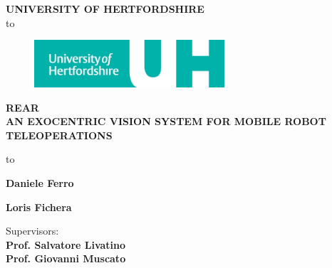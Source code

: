 \begin{titlepage}
  \begin{center}
    \textbf{\uppercase{University of HertfordShire}}\\
    \hbox to \textwidth{\hrulefill}
    
    \vspace{1truecm}
    
    \begin{figure}[!h]
      \begin{center}
        \includegraphics[width=200pt]{img/uni_logo}  %
      \end{center}
    \end{figure}
              
    \uppercase{ \textbf{
        REAR \\ an exocentric vision system for mobile robot teleoperations 
      }}
              
    \vspace{1truecm}
    
    \hbox to \textwidth{\hrulefill}
    
    \vspace{1truecm}
    
    \begin{flushright}
      \textbf{Daniele Ferro} \\                
      \vspace{0.5truecm}
      
      \textbf{Loris Fichera} \\
      \vspace{1truecm}
                
      Supervisors:\\
      \textbf{Prof. Salvatore Livatino }\\
      \textbf{Prof. Giovanni Muscato}
                
    \end{flushright}
    
    \vspace{1truecm}
    
  \end{center}
  
\end{titlepage}

\setlength{\baselineskip}{1.3\baselineskip} %

\tableofcontents

\newpage
